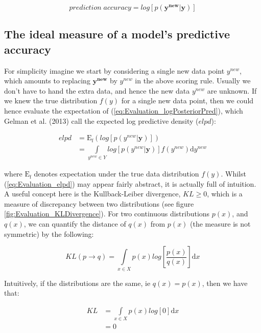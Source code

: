 \documentclass[11pt,fullpage]{book}
\begin{document}
\begin{equation}\label{eq:Evaluation_logPosteriorPred}
prediction\; accuracy = log\left[p(\boldsymbol{y^{new}}|\boldsymbol{y})\right]
\end{equation}

\subsection{The ideal measure of a model's predictive accuracy}\label{sec:Evaluation_idealAccuracy}
For simplicity imagine we start by considering a single new data point $y^{new}$, which amounts to replacing $\boldsymbol{y^{new}}$ by $y^{new}$ in the above scoring rule. Usually we don't have to hand the extra data, and hence the new data $y^{new}$ are unknown. If we knew the true distribution $f(y)$ for a single new data point, then we could hence evaluate the expectation of (\ref{eq:Evaluation_logPosteriorPred}), which Gelman et al. (2013) call the expected log predictive density ($elpd$):

\begin{equation}\label{eq:Evaluation_elpd}
\begin{align}
elpd &= \mathrm{E_f}\left(log\left[p(y^{new}|\boldsymbol{y})\right]\right)\\
&= \int\limits_{y^{new}\in Y} log\left[p(y^{new}|\boldsymbol{y})\right] f(y^{new})\mathrm{d}y^{new}
\end{align}
\end{equation}

where $\mathrm{E_f}$ denotes expectation under the true data distribution $f(y)$. Whilst (\ref{eq:Evaluation_elpd}) may appear fairly abstract, it is actually full of intuition. A useful concept here is the Kullback-Leiber divergence, $KL\geq 0$, which is a measure of discrepancy between two distributions (see figure \ref{fig:Evaluation_KLDivergence}). For two continuous distributions $p(x)$, and $q(x)$, we can quantify the distance of $q(x)$ from $p(x)$ (the measure is not symmetric) by the following:

\begin{equation}\label{eq:Evaluation_KL}
KL(p\rightarrow q) = \int\limits_{x\in X} p(x) log\left[\frac{p(x)}{q(x)}\right]\mathrm{d}x
\end{equation}

Intuitively, if the distributions are the same, ie $q(x)=p(x)$, then we have that:

\begin{equation}
\begin{align}
KL &= \int\limits_{x\in X} p(x) log\left[0\right]\mathrm{d}x\\
&= 0
\end{align}
\end{equation}
\end{document}
